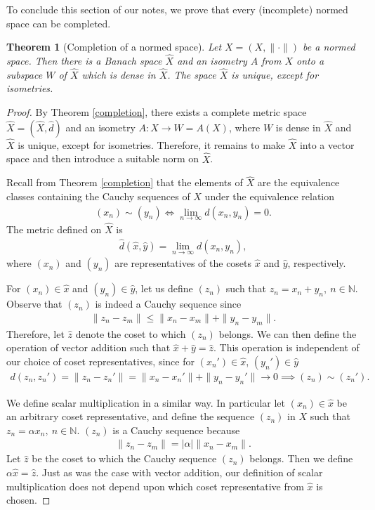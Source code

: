 \documentclass[11pt]{article}
\theoremstyle{mystyle}
\newtheorem{thm}{Theorem}[section]
\newcommand{\0}{\mathbf{0}}
\begin{document}
To conclude this section of our notes, we prove that every (incomplete) normed space can be completed. 
\begin{thm}[Completion of a normed space]\label{completionnorm}
Let $X = (X, \|\cdot\|)$ be a normed space. Then there is a Banach space $\hat{X}$ and an isometry $A$ from $X$ onto a subspace $W$ of $\hat{X}$ which is dense in $\hat{X}$. The space $\hat{X}$ is unique, except for isometries. 
\end{thm}
\begin{proof}
By Theorem \ref{completion}, there exists a complete metric space $\hat{X} = (\hat{X}, \hat{d})$ and an isometry $A: X \longrightarrow W = A(X)$, where $W$ is dense in $\hat{X}$ and $\hat{X}$ is unique, except for isometries. Therefore, it remains to make $\hat{X}$ into a vector space and then introduce a suitable norm on $\hat{X}$.

Recall from Theorem \ref{completion} that the elements of $\hat{X}$ are the equivalence classes containing the Cauchy sequences of $X$ under the equivalence relation
\begin{align*}
    (x_n) \sim (y_n) \iff \lim_{n \to \infty} d(x_n, y_n) = 0.
\end{align*}
The metric defined on $\hat{X}$ is
\begin{align*}
    \hat{d}(\hat{x}, \hat{y}) = \lim_{n \to \infty} d(x_n, y_n),
\end{align*}
where $(x_n)$ and $(y_n)$ are representatives of the cosets $\hat{x}$ and $\hat{y}$, respectively.

For $(x_n) \in \hat{x}$ and $(y_n) \in \hat{y}$, let us define $(z_n)$ such that $z_n = x_n + y_n, \ n \in \mathbb{N}$. Observe that $(z_n)$ is indeed a Cauchy sequence since
\begin{align*}
    \|z_n - z_m\| \leq \|x_n - x_m\| + \|y_n - y_m\|.
\end{align*}
Therefore, let $\hat{z}$ denote the coset to which $(z_n)$ belongs. We can then define the operation of vector addition such that $\hat{x} + \hat{y} = \hat{z}$. This operation is independent of our choice of coset representatives, since for $(x_n') \in \hat{x}$,  $(y_n') \in \hat{y}$
\begin{align*}
    d(z_n, z_n') = \|z_n - z_n' \| = \|x_n - x_n'\| + \|y_n - y_n'\| \longrightarrow 0 \implies (z_n) \sim (z_n'). 
\end{align*}

We define scalar multiplication in a similar way. In particular let $(x_n) \in \hat{x}$ be an arbitrary coset representative, and define the sequence $(z_n)$ in $X$ such that $z_n = \alpha x_n, \ n \in \mathbb{N}$. $(z_n)$ is a Cauchy sequence because
\begin{align*}
    \|z_n - z_m\| = |\alpha|\|x_n - x_m\|.
\end{align*}
Let $\hat{z}$ be the coset to which the Cauchy sequence $(z_n)$ belongs. Then we define $\alpha \hat{x} = \hat{z}$. Just as was the case with vector addition, our definition of scalar multiplication does not depend upon which coset representative from $\hat{x}$ is chosen.


\end{proof}
\end{document}
